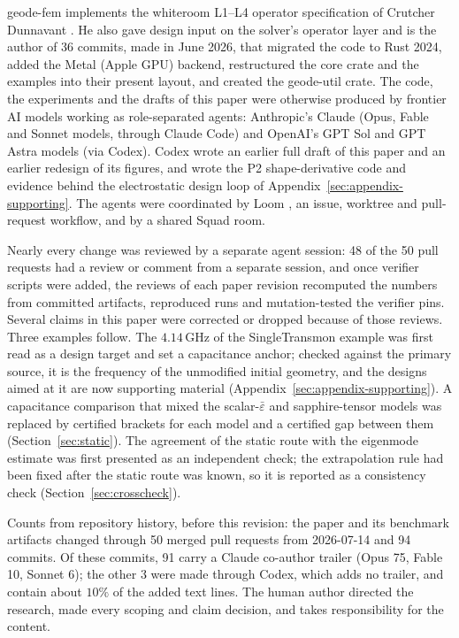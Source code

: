\documentclass{anvil-paper}
\begin{document}
geode-fem implements the whiteroom L1--L4 operator specification of
Crutcher Dunnavant \citep{dunnavant2026whiteroom}. He also gave design
input on the solver's operator layer and is the author of 36 commits, made
in June 2026, that migrated the code to Rust 2024, added the Metal (Apple
GPU) backend, restructured the core crate and the examples into their
present layout, and created the geode-util crate. The code, the experiments and the drafts of
this paper were otherwise produced by frontier AI models working as
role-separated agents: Anthropic's Claude (Opus, Fable and Sonnet models,
through Claude Code) and OpenAI's GPT Sol and GPT Astra models (via
Codex). Codex wrote an earlier full draft of this paper and an earlier
redesign of its figures, and wrote the P2 shape-derivative code and
evidence behind the electrostatic design loop of
Appendix~\ref{sec:appendix-supporting}. The agents were
coordinated by Loom \citep{loom}, an issue, worktree and pull-request
workflow, and by a shared Squad room.

Nearly every change was reviewed by a separate agent session: 48 of the
50 pull requests had a review or comment from a separate session,
and once verifier scripts were added, the reviews of each paper revision
recomputed the numbers from committed artifacts, reproduced runs and
mutation-tested the verifier pins. Several
claims in this paper were corrected or dropped because of those reviews.
Three examples follow. The $4.14$\,GHz of the
SingleTransmon example was first read as a design target and set a
capacitance anchor; checked against the primary source, it is the
frequency of the unmodified initial geometry, and the designs aimed at it
are now supporting material (Appendix~\ref{sec:appendix-supporting}). A
capacitance comparison that mixed the scalar-$\bar\varepsilon$ and
sapphire-tensor models was replaced by certified brackets for each model
and a certified gap between them (Section~\ref{sec:static}). The agreement
of the static route with the eigenmode estimate was first presented as an
independent check; the extrapolation rule had been fixed after the static
route was known, so it is reported as a consistency check
(Section~\ref{sec:crosscheck}).

Counts from repository history, before this revision: the paper and its
benchmark artifacts changed through 50 merged pull requests from
2026-07-14 and 94 commits. Of these commits, 91 carry a Claude co-author
trailer (Opus 75, Fable 10, Sonnet 6); the other 3 were made through
Codex, which adds no trailer, and contain about $10\%$ of the added text
lines. The human author directed the research, made every scoping and
claim decision, and takes responsibility for the content.
\end{document}
